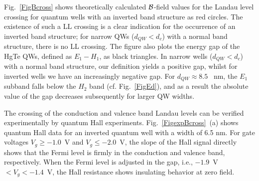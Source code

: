 \documentclass{article}
\begin{document}
Fig.~\ref{FigBcross} shows theoretically calculated
${\cal{B}}$-field values for the Landau level crossing for quantum
wells with an inverted band structure as red circles. The existence
of such a LL crossing is a clear indication for the occurrence of an
inverted band structure; for narrow QWs ($d_{QW}<d_{c}$) with a
normal band structure, there is no LL crossing. The figure also
plots the energy gap of the HgTe QWs, defined as $E_1 - H_1$, as
black triangles. In narrow wells ($d_{QW}<d_{c}$) with a normal band
structure, our definition yields a positive gap, whilst for inverted
wells we have an increasingly negative gap. For $d_{QW}\approx8.5$~
nm, the $E_1$ subband falls below the $H_2$ band (cf.
Fig.~\ref{FigEd}), and as a result the absolute value of the gap
decreases subsequently for larger QW widths.


The crossing of the conduction and valence band Landau levels can be
verified experimentally by quantum Hall experiments.
Fig.~\ref{FigexpBcross}~(a) shows quantum Hall data for an inverted
quantum well with a width of 6.5 nm. For gate voltages
$V_g\geq-1.0$~V and $V_g\leq-2.0$~V, the slope of the Hall signal
directly shows that the Fermi level is firmly in the conduction and
valence band, respectively. When the Fermi level is adjusted in the
gap, i.e., $-1.9$~V$<V_g<-1.4$~V, the Hall resistance shows
insulating behavior at zero field.
\end{document}
